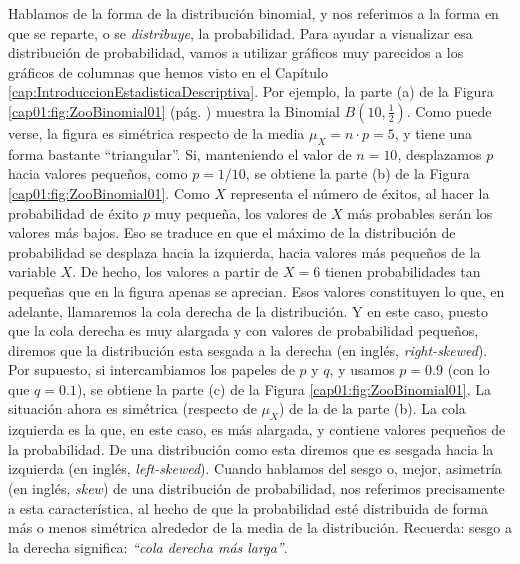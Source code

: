 Hablamos de la forma de la distribución binomial, y nos referimos a la forma en que se reparte, o
se {\em distribuye}, la probabilidad. Para ayudar a visualizar esa distribución de probabilidad,
vamos a utilizar gráficos muy parecidos a los gráficos de columnas que hemos visto en el Capítulo
\ref{cap:IntroduccionEstadisticaDescriptiva}. Por ejemplo, la parte (a) de la Figura
\ref{cap01:fig:ZooBinomial01} (pág. \pageref{cap01:fig:ZooBinomial01}) muestra la Binomial
$B(10,\frac{1}{2})$. Como puede verse, la figura es simétrica respecto de la media $\mu_X=n\cdot
p=5$, y tiene una forma bastante ``triangular''.  Si, manteniendo el valor de $n=10$, desplazamos
$p$ hacia valores pequeños, como $p=1/10$, se obtiene la parte (b) de la Figura
\ref{cap01:fig:ZooBinomial01}.  Como $X$ representa el número de éxitos, al hacer la probabilidad
de éxito $p$ muy pequeña, los valores de $X$ más probables serán los valores más bajos. Eso se
traduce en que el máximo de la distribución de probabilidad se desplaza hacia la izquierda, hacia
valores más pequeños de la variable $X$. De hecho, los valores a partir de $X=6$ tienen
probabilidades tan pequeñas que en la figura apenas se aprecian. Esos valores constituyen lo que,
en adelante, llamaremos la {\sf cola derecha} de la distribución. Y en este caso, puesto que la cola derecha es muy alargada y
con valores de probabilidad pequeños, diremos que la distribución esta {\sf sesgada a la
derecha} (en inglés, {\em
right-skewed}). Por supuesto, si intercambiamos los papeles de $p$ y $q$, y
usamos $p=0.9$ (con lo que $q=0.1$), se obtiene la parte (c) de la Figura
\ref{cap01:fig:ZooBinomial01}. La situación ahora es simétrica (respecto de $\mu_X$) de la de la
parte (b). La {\sf cola izquierda} es la que, en este caso, es más alargada, y contiene valores
pequeños de la probabilidad. De una distribución como esta diremos que es sesgada hacia la
izquierda (en  inglés, {\em left-skewed}). Cuando hablamos del {\sf sesgo} o, mejor, {\sf
asimetría} (en inglés, {\em skew}) de una distribución de
probabilidad, nos referimos precisamente a esta característica, al hecho de que la probabilidad
esté distribuida de forma más o menos simétrica alrededor de la media de la distribución. Recuerda: sesgo a la derecha significa: {\em ``cola derecha más larga''}.


